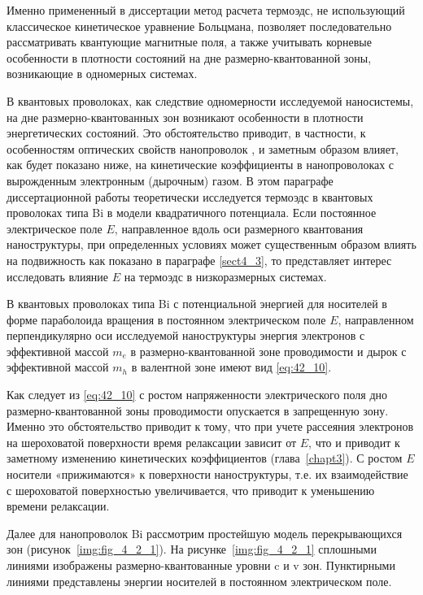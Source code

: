 Именно примененный в диссертации метод расчета термоэдс, не использующий классическое кинетическое уравнение Больцмана, позволяет последовательно рассматривать квантующие магнитные поля, а также учитывать корневые особенности в плотности состояний на дне размерно-квантованной зоны, возникающие в одномерных системах.

В квантовых проволоках, как следствие одномерности исследуемой наносистемы, на дне размерно-квантованных зон возникают особенности в плотности энергетических состояний. Это обстоятельство приводит, в частности, к особенностям оптических свойств нанопроволок \cite{Black2003a,Black2000,Black2002,Levin2009a}, и заметным образом влияет, как будет показано ниже, на кинетические коэффициенты в нанопроволоках с вырожденным электронным (дырочным) газом. В этом параграфе диссертационной работы теоретически исследуется термоэдс в квантовых проволоках типа Bi в модели квадратичного потенциала. Если постоянное электрическое поле $E$, направленное вдоль оси размерного квантования наноструктуры, при определенных условиях может существенным образом влиять на подвижность как показано в параграфе \ref{sect4_3}, то представляет интерес исследовать влияние $E$ на термоэдс в низкоразмерных системах.

В квантовых проволоках типа Bi с потенциальной энергией для носителей в форме параболоида вращения в постоянном электрическом поле $E$, направленном перпендикулярно оси исследуемой наноструктуры энергия электронов с эффективной массой $m_e $ в размерно-квантованной зоне проводимости и дырок с эффективной массой $m_h$ в валентной зоне имеют вид \eqref{eq:42_10}.

Как следует из \eqref{eq:42_10} с ростом напряженности электрического поля дно размерно-квантованной зоны проводимости опускается в запрещенную зону. Именно это обстоятельство приводит к тому, что при учете рассеяния электронов на шероховатой поверхности время релаксации зависит от $E$, что и приводит к заметному изменению кинетических коэффициентов (глава~\ref{chapt3}). С ростом $E$ носители «прижимаются» к поверхности наноструктуры, т.е. их взаимодействие с шероховатой поверхностью увеличивается, что приводит к уменьшению времени релаксации.

Далее для нанопроволок Bi рассмотрим простейшую модель перекрывающихся зон (рисунок~\ref{img:fig_4_2_1}). На рисунке~\ref{img:fig_4_2_1} сплошными линиями изображены  размерно-квантованные уровни c и v зон. Пунктирными линиями представлены энергии носителей в постоянном электрическом поле.

